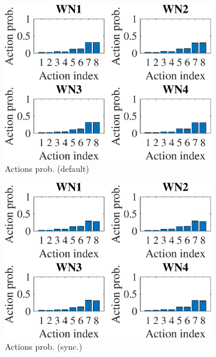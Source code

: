 \documentclass[preprint,12pt]{article}
\begin{document}
\begin{figure}[h!]
	\centering
	\begin{subfigure}[b]{.3\textwidth}
		\includegraphics[width=\textwidth]{images/actions_probability_UCB}
		\caption{Actions prob. (default)}\label{fig:actions_probability_UCB}
	\end{subfigure}
	\begin{subfigure}[b]{.3\textwidth}
		\includegraphics[width=\textwidth]{images/actions_probability_OUCB}
		\caption{Actions prob. (sync.)}\label{fig:actions_probability_OUCB}
	\end{subfigure}
	\begin{subfigure}[b]{.3\textwidth}

\end{subfigure}
\end{figure}
\end{document}
